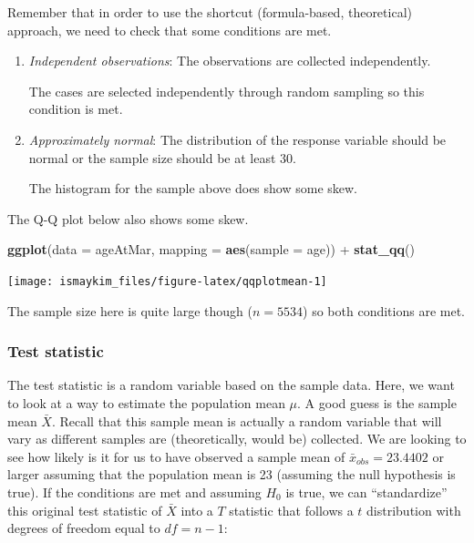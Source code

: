 \documentclass[]{tufte-book}
\newenvironment{Shaded}{\begin{snugshade}}{\end{snugshade}}
\newcommand{\KeywordTok}[1]{\textcolor[rgb]{0.13,0.29,0.53}{\textbf{{#1}}}}
\newcommand{\DataTypeTok}[1]{\textcolor[rgb]{0.13,0.29,0.53}{{#1}}}
\newcommand{\StringTok}[1]{\textcolor[rgb]{0.31,0.60,0.02}{{#1}}}
\newcommand{\NormalTok}[1]{{#1}}
\theoremstyle{definition}
\theoremstyle{definition}
\theoremstyle{remark}
\begin{document}
Remember that in order to use the shortcut (formula-based, theoretical)
approach, we need to check that some conditions are met.

\begin{enumerate}
\def\labelenumi{\arabic{enumi}.}
\item
  \emph{Independent observations}: The observations are collected
  independently.

  The cases are selected independently through random sampling so this
  condition is met.
\item
  \emph{Approximately normal}: The distribution of the response variable
  should be normal or the sample size should be at least 30.

  The histogram for the sample above does show some skew.
\end{enumerate}

The Q-Q plot below also shows some skew.

\begin{Shaded}
\begin{Highlighting}[]
\KeywordTok{ggplot}\NormalTok{(}\DataTypeTok{data =} \NormalTok{ageAtMar, }\DataTypeTok{mapping =} \KeywordTok{aes}\NormalTok{(}\DataTypeTok{sample =} \NormalTok{age)) +}
\StringTok{  }\KeywordTok{stat_qq}\NormalTok{()}
\end{Highlighting}
\end{Shaded}

\begin{center}\texttt{[image: ismaykim\_files/figure-latex/qqplotmean-1]} \end{center}

The sample size here is quite large though (\(n = 5534\)) so both
conditions are met.

\subsubsection{Test statistic}\label{test-statistic}

The test statistic is a random variable based on the sample data. Here,
we want to look at a way to estimate the population mean \(\mu\). A good
guess is the sample mean \(\bar{X}\). Recall that this sample mean is
actually a random variable that will vary as different samples are
(theoretically, would be) collected. We are looking to see how likely is
it for us to have observed a sample mean of \(\bar{x}_{obs} = 23.4402\)
or larger assuming that the population mean is 23 (assuming the null
hypothesis is true). If the conditions are met and assuming \(H_0\) is
true, we can ``standardize'' this original test statistic of \(\bar{X}\)
into a \(T\) statistic that follows a \(t\) distribution with degrees of
freedom equal to \(df = n - 1\):
\end{document}
